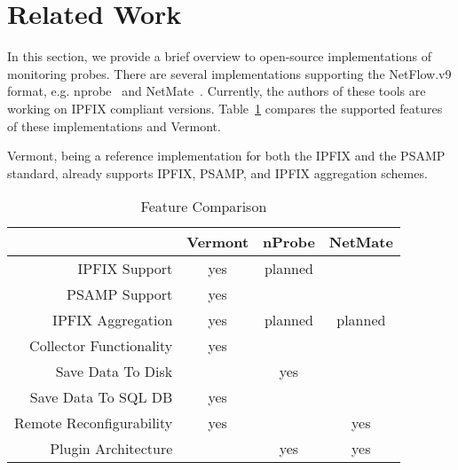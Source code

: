 \section{Related Work}
\label{sec:related-work}


In this section, we provide a brief overview to open-source implementations of monitoring probes.
There are several implementations supporting the NetFlow.v9 format, e.g. nprobe~\cite{deri2003nprobe} and NetMate~\cite{schmoll2004netmate}. Currently, the authors of these tools are working on IPFIX compliant versions.
Table~\ref{tab:features} compares the supported features of these implementations and Vermont.

Vermont, being a reference implementation for both the IPFIX and the PSAMP standard, already supports IPFIX, PSAMP, and IPFIX aggregation schemes.

\begin{table}
\renewcommand{\arraystretch}{1.0}
\caption{Feature Comparison}
\label{tab:features}
\begin{center}
\begin{tabular}{r|c|c|c}
 & Vermont & nProbe & NetMate\\
\hline
IPFIX Support & yes & planned & \\
PSAMP Support & yes &  & \\
IPFIX Aggregation & yes & planned & planned\\
Collector Functionality & yes &  & \\
Save Data To Disk &  & yes & \\
Save Data To SQL DB & yes & & \\
Remote Reconfigurability & yes &  & yes\\
Plugin Architecture &  & yes & yes\\
\hline
\end{tabular}
\end{center}
\end{table}

